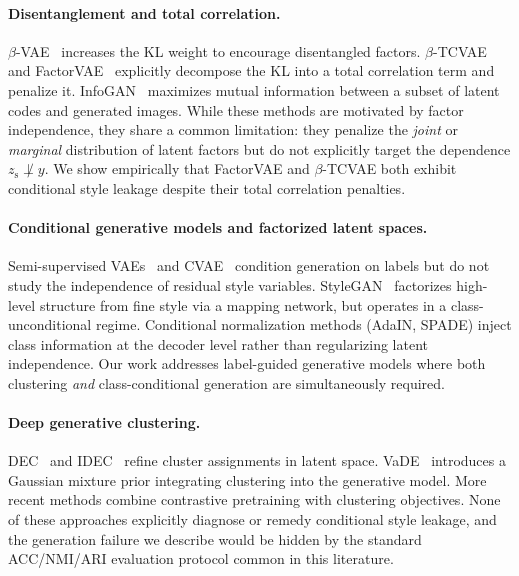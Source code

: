\documentclass[10pt]{article}
\newcommand{\zs}{z_{\mathrm{s}}}
\begin{document}
\paragraph{Disentanglement and total correlation.}
$\beta$-VAE~\citep{higgins2017beta} increases the KL weight to encourage
disentangled factors.
$\beta$-TCVAE~\citep{chen2018isolating} and FactorVAE~\citep{kim2018disentangling}
explicitly decompose the KL into a total correlation term and penalize it.
InfoGAN~\citep{chen2016infogan} maximizes mutual information between a subset of
latent codes and generated images.
While these methods are motivated by factor independence, they share a common
limitation: they penalize the \emph{joint} or \emph{marginal} distribution of
latent factors but do not explicitly target the dependence $\zs\not\perp y$.
We show empirically that FactorVAE and $\beta$-TCVAE both exhibit conditional
style leakage despite their total correlation penalties.

\paragraph{Conditional generative models and factorized latent spaces.}
Semi-supervised VAEs~\citep{kingma2014semi} and CVAE~\citep{sohn2015learning}
condition generation on labels but do not study the independence of residual
style variables.
StyleGAN~\citep{karras2019style} factorizes high-level structure from fine style
via a mapping network, but operates in a class-unconditional regime.
Conditional normalization methods (AdaIN, SPADE) inject class information at
the decoder level rather than regularizing latent independence.
Our work addresses label-guided generative models where both clustering
\emph{and} class-conditional generation are simultaneously required.

\paragraph{Deep generative clustering.}
DEC~\citep{xie2015unsupervised} and IDEC~\citep{guo2017improved} refine
cluster assignments in latent space.
VaDE~\citep{jiang2016variational} introduces a Gaussian mixture prior integrating
clustering into the generative model.
More recent methods combine contrastive pretraining with clustering objectives.
None of these approaches explicitly diagnose or remedy conditional style leakage,
and the generation failure we describe would be hidden by the standard ACC/NMI/ARI
evaluation protocol common in this literature.
\end{document}
